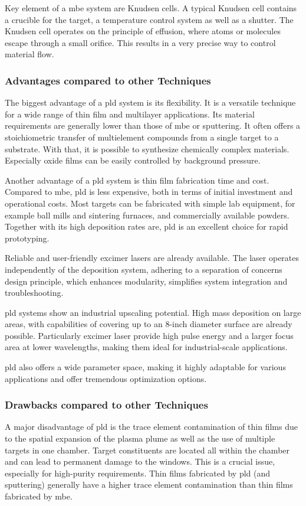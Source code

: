 Key element of a \ac{mbe} system are Knudsen cells. 
A typical Knudsen cell contains a crucible for the target, a temperature control system 
as well as a shutter. 
The Knudsen cell operates on the principle of effusion, where atoms or molecules escape 
through a small orifice. 
This results in a very precise way to control material flow. 

\subsubsection{Advantages compared to other Techniques}
The biggest advantage of a \ac{pld} system is its flexibility. 
It is a versatile technique for a wide range of thin film and multilayer applications.
Its material requirements are generally lower than those of \ac{mbe} or sputtering.
It often offers a stoichiometric transfer of multielement compounds from a single 
target to a substrate.
With that, it is possible to synthesize chemically complex materials. 
Especially oxide films can be easily controlled by background pressure. 

Another advantage of a \ac{pld} system is thin film fabrication time and cost. 
Compared to \ac{mbe}, \ac{pld} is less expensive, both in terms of initial investment 
and operational costs.
Most targets can be fabricated with simple lab equipment, for example ball mills and 
sintering furnaces, and commercially available powders.
Together with its high deposition rates are, \ac{pld} is an excellent choice for
rapid prototyping.    

Reliable and user-friendly excimer lasers are already available. 
The laser operates independently of the deposition system, adhering to a separation 
of concerns design principle, which enhances modularity, simplifies system 
integration and troubleshooting.

\ac{pld} systems show an industrial upscaling potential. 
High mass deposition on large areas, with capabilities of covering up to an 8-inch 
diameter surface are already possible. 
Particularly excimer laser provide high pulse energy and a larger focus area at 
lower wavelengths, making them ideal for industrial-scale applications.

\ac{pld} also offers a wide parameter space, making it highly adaptable for various 
applications and offer tremendous optimization options.

\subsubsection{Drawbacks compared to other Techniques}
A major disadvantage of \ac{pld} is the trace element contamination of 
thin films due to the spatial expansion of the plasma plume as well as the use of 
multiple targets in one chamber.
Target constituents are located all within the chamber and can lead to permanent damage 
to the windows.
This is a crucial issue, especially for high-purity requirements.
Thin films fabricated by \ac{pld} (and sputtering) generally have a higher trace element contamination 
than thin films fabricated by \ac{mbe}. 


